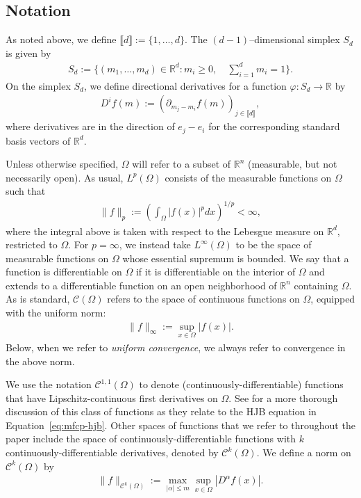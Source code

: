 \documentclass[11pt,reqno]{amsart}
\numberwithin{equation}{section}
\theoremstyle{plain}
\newcommand{\R}{\mathbb{R}}
\newcommand{\sC}{\mathcal{C}}
\newcommand{\lbrs}[1]{\llbracket #1 \rrbracket}
\begin{document}
\subsection{Notation}
As noted above, we define $\lbrs{d} := \{1, \ldots, d\}$. The $(d-1)$--dimensional simplex $S_d$ is given by
\begin{align}
    \label{eq:simplex}
    S_d := \Big\{(m_1, \ldots, m_d) \in \R^{d} : m_i \geq 0, \quad \sum_{i=1}^d m_i = 1\Big\}.
\end{align}
On the simplex $S_d$, we define directional derivatives for a function $\varphi : S_d \to \R$ by
\begin{align*}
    D^i f(m) := (\partial_{m_j - m_i} f(m))_{j \in \lbrs{d}},
\end{align*}
where derivatives are in the direction of $e_j - e_i$ for the corresponding standard basis vectors of $\R^d$.

Unless otherwise specified, $\Omega$ will refer to a subset of $\R^n$ (measurable, but not necessarily open). As usual, $L^p(\Omega)$ consists of the measurable functions on $\Omega$ such that
\begin{align*}
    \|f\|_{p} := \left(\int_{\Omega} |f(x)|^p dx\right)^{1/p} < \infty,
\end{align*}
where the integral above is taken with respect to the Lebesgue measure on $\R^d$, restricted to $\Omega$. For $p = \infty$, we instead take $L^\infty(\Omega)$ to be the space of measurable functions on $\Omega$ whose essential supremum is bounded. We say that a function is differentiable on $\Omega$ if it is differentiable on the interior of $\Omega$ and extends to a differentiable function on an open neighborhood of $\R^n$ containing $\Omega$. As is standard, $\sC(\Omega)$ refers to the space of continuous functions on $\Omega$, equipped with the uniform norm:
\begin{align*}
    \|f\|_{\infty} := \sup_{x \in \Omega} |f(x)|.
\end{align*}
Below, when we refer to \textit{uniform convergence}, we always refer to convergence in the above norm.

We use the notation $\sC^{1,1}(\Omega)$ to denote (continuously-differentiable) functions that have Lipschitz-continuous first derivatives on $\Omega$. See \cite{mfcp} for a more thorough discussion of this class of functions as they relate to the HJB equation in Equation~\eqref{eq:mfcp-hjb}. Other spaces of functions that we refer to throughout the paper include the space of continuously-differentiable functions with $k$ continuously-differentiable derivatives, denoted by $\sC^k(\Omega)$. We define a norm on $\sC^k(\Omega)$ by
\begin{align*}
    \|f\|_{\sC^k(\Omega)} := \max_{|\alpha| \leq m} \sup_{x \in \Omega} |D^\alpha f(x)|.
\end{align*}
\end{document}

